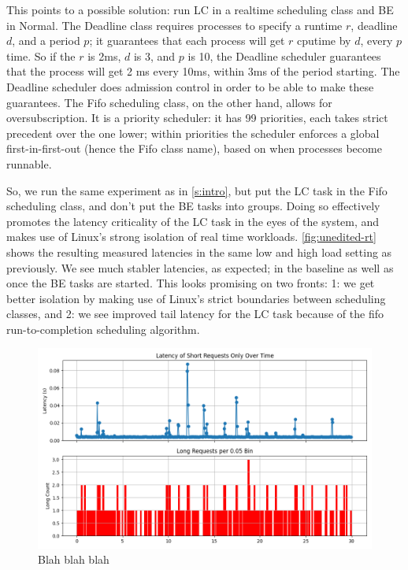 This points to a possible solution: run LC in a realtime scheduling class and BE
in Normal. The Deadline class requires processes to specify a runtime $r$,
deadline $d$, and a period $p$; it guarantees that each process will get $r$
cputime by $d$, every $p$ time. So if the $r$ is 2ms, $d$ is 3, and $p$ is 10,
the Deadline scheduler guarantees that the process will get 2 ms every 10ms,
within 3ms of the period starting. The Deadline scheduler does admission control
in order to be able to make these guarantees. The Fifo scheduling class, on the
other hand, allows for oversubscription. It is a priority scheduler: it has 99
priorities, each takes strict precedent over the one lower; within priorities
the scheduler enforces a global first-in-first-out (hence the Fifo class name),
based on when processes become runnable.

So, we run the same experiment as in \autoref{s:intro}, but put the
LC task in the Fifo scheduling class, and don't put the BE tasks into groups.
Doing so effectively promotes the latency criticality of the LC task in the eyes
of the system, and makes use of Linux's strong isolation of real time workloads.
\autoref{fig:unedited-rt} shows the resulting measured latencies in the same
low and high load setting as previously. We see much stabler latencies, as
expected; in the baseline as well as once the BE tasks are started. This looks
promising on two fronts: 1: we get better isolation by making use of Linux's
strict boundaries between scheduling classes, and 2: we see improved tail
latency for the LC task because of the fifo run-to-completion scheduling
algorithm.

\begin{figure}[t]
    \centering
    \includegraphics[width=\columnwidth]{graphs/hol-blocking.png}
    \caption{Blah blah blah}\label{fig:hol-blocking}
\end{figure}


